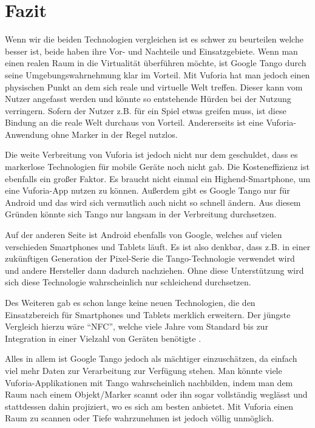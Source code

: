 
\section{Fazit}
Wenn wir die beiden Technologien vergleichen ist es schwer zu beurteilen welche besser ist, beide haben ihre Vor- und Nachteile und Einsatzgebiete. Wenn man einen realen Raum in die Virtualität überführen möchte, ist Google Tango durch seine Umgebungswahrnehmung klar im Vorteil. Mit Vuforia hat man jedoch einen physischen Punkt an dem sich reale und virtuelle Welt treffen. Dieser kann vom Nutzer angefasst werden und könnte so entstehende Hürden bei der Nutzung verringern. Sofern der Nutzer z.B. für ein Spiel etwas greifen muss, ist diese Bindung an die reale Welt durchaus von Vorteil. Andererseits ist eine Vuforia-Anwendung ohne Marker in der Regel nutzlos.\par
Die weite Verbreitung von Vuforia ist jedoch nicht nur dem geschuldet, dass es markerlose Technologien für mobile Geräte noch nicht gab. Die Kosteneffizienz ist ebenfalls ein großer Faktor. Es braucht nicht einmal ein Highend-Smartphone, um eine Vuforia-App nutzen zu können. Außerdem gibt es Google Tango nur für Android und das wird sich vermutlich auch nicht so schnell ändern. Aus diesem Gründen könnte sich Tango nur langsam in der Verbreitung durchsetzen.\par
Auf der anderen Seite ist Android ebenfalls von Google, welches auf vielen verschieden Smartphones und Tablets läuft. Es ist also denkbar, dass z.B. in einer zukünftigen Generation der Pixel-Serie die Tango-Technologie verwendet wird und andere Hersteller dann dadurch nachziehen. Ohne diese Unterstützung wird sich diese Technologie wahrscheinlich nur schleichend durchsetzen.\par
Des Weiteren gab es schon lange keine neuen Technologien, die den Einsatzbereich für Smartphones und Tablets merklich erweitern. Der jüngste Vergleich hierzu wäre "`NFC"', welche viele Jahre vom Standard bis zur Integration in einer Vielzahl von Geräten benötigte \cite{nfc_iso}\cite{android_pay}.\par
Alles in allem ist Google Tango jedoch als mächtiger einzuschätzen, da einfach viel mehr Daten zur Verarbeitung zur Verfügung stehen. Man könnte viele Vuforia-Applikationen mit Tango wahrscheinlich nachbilden, indem man dem Raum nach einem Objekt/Marker scannt oder ihn sogar vollständig weglässt und stattdessen dahin projiziert, wo es sich am besten anbietet. Mit Vuforia einen Raum zu scannen oder Tiefe wahrzunehmen ist jedoch völlig unmöglich.